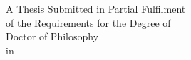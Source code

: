 %
%


\begin{titlepage}
	\tgherosfont
	\centering
		

	\vfill
	
	\vspace*{1.0cm}
    {\LARGE \textbf{\thesisTitle} \\[30mm]}
	
	{\LARGE \thesisName } \\[30mm]
	{\Large A Thesis Submitted in Partial Fulfilment} \\[5mm]		
	{\Large of the Requirements for the Degree of} \\ [5mm]	
	{\Large Doctor of Philosophy} \\ [5mm]
	{\Large in } \\ [5mm]
	{\Large \thesisUniversityDepartment} \\  [40mm]
	{\Large \thesisUniversity} \\ [5mm]
 	{\Large \thesisDate}
 	

\end{titlepage}
